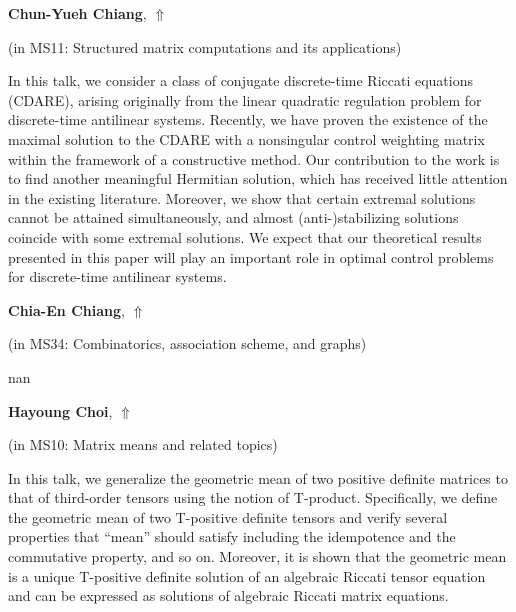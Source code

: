 \documentclass[ILAS2025-program.tex]{subfiles}
\begin{document}
\hypertarget{down0268}{}\begin{ilasabstract}
    
\textbf{Chun-Yueh Chiang},  \hfill \hyperlink{up0268}{$\Uparrow$}
    
    
(in {\color{mstitle}MS11: Structured matrix computations and its applications})
        
\mtskip
    In this talk, we consider a class of conjugate discrete-time Riccati equations (CDARE), arising originally
from the linear quadratic regulation problem for discrete-time antilinear systems. Recently, we have proven
the existence of the maximal solution to the CDARE with a nonsingular control weighting matrix within
the framework of a constructive method. Our contribution to the work is to find another meaningful
Hermitian solution, which has received little attention in the existing literature. Moreover, we show that
certain extremal solutions cannot be attained simultaneously, and almost (anti-)stabilizing solutions coincide
with some extremal solutions. We expect that our theoretical results presented in this paper will play an
important role in optimal control problems for discrete-time antilinear systems.

\end{ilasabstract}
    

\hypertarget{down0323}{}\begin{ilasabstract}
    
\textbf{Chia-En Chiang},  \hfill \hyperlink{up0323}{$\Uparrow$}
    
    
(in {\color{mstitle}MS34: Combinatorics, association scheme, and graphs})
        
\mtskip
    nan
\end{ilasabstract}
    

\hypertarget{down0024}{}\begin{ilasabstract}
    
\textbf{Hayoung Choi},  \hfill \hyperlink{up0024}{$\Uparrow$}
    
    
(in {\color{mstitle}MS10: Matrix means and related topics})
        
\mtskip
    In this talk, we generalize the geometric mean of two positive definite matrices to that of third-order tensors using the notion of T-product. Specifically, we define the geometric mean of two T-positive definite tensors and verify several properties that ``mean'' should satisfy including the idempotence and the commutative property, and so on. Moreover, it is shown that the geometric mean is a unique T-positive definite solution of an algebraic Riccati tensor equation and can be expressed as solutions of algebraic Riccati matrix equations. 

\end{ilasabstract}
    
\end{document}
